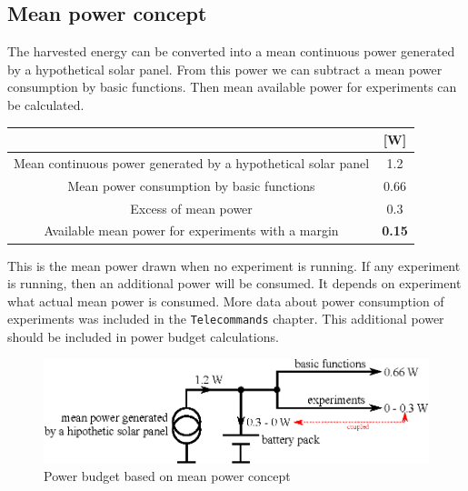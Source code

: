 \subsection{Mean power concept}
The harvested energy can be converted into a mean continuous power generated by a hypothetical solar panel. From this power we can subtract a mean power consumption by basic functions. Then mean available power for experiments can be calculated.

\begin{center}
	\begin{tabular}{c|c}
		&[W] \\ \hline
		Mean continuous power generated by a hypothetical solar panel & 1.2 \\ \hline
		Mean power consumption by basic functions & 0.66 \\ \hline
		Excess of mean power & 0.3 \\ \hline
		Available mean power for experiments with a margin & \textbf{0.15}
	\end{tabular}
\end{center}

This is the mean power drawn when no experiment is running. If any experiment is running, then an additional power will be consumed. It depends on experiment what actual mean power is consumed. More data about power consumption of experiments was included in the \texttt{Telecommands} chapter. This additional power should be included in power budget calculations.

\begin{figure}[ht]
	\begin{center}
		\includegraphics{img/power-budget-power}
		\caption{Power budget based on mean power concept}
		\label{fig:pwr:power}
	\end{center}
\end{figure}

